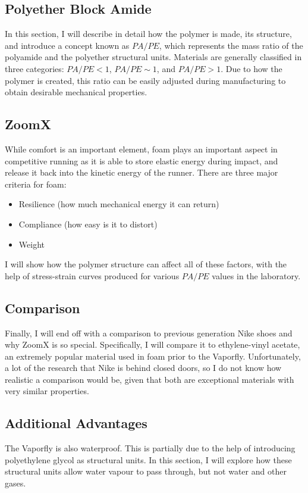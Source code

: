 \documentclass{article}
\begin{document}
    \subsection{Polyether Block Amide}
    In this section, I will describe in detail how the polymer is made, its structure, and introduce a concept known as $PA/PE$, which represents the mass ratio of the polyamide and the polyether structural units. Materials are generally classified in three categories: $PA/PE < 1$, $PA/PE \sim 1$, and $PA/PE > 1$. Due to how the polymer is created, this ratio can be easily adjusted during manufacturing to obtain desirable mechanical properties.\cite{Eustache2006}
    \subsection{ZoomX}
    While comfort is an important element, foam plays an important aspect in competitive running as it is able to store elastic energy during impact, and release it back into the kinetic energy of the runner. There are three major criteria for foam\cite{Hoogkamer2017}:
    \begin{itemize}
        \item Resilience (how much mechanical energy it can return)
        \item Compliance (how easy is it to distort)
        \item Weight
    \end{itemize}
    I will show how the polymer structure can affect all of these factors, with the help of stress-strain curves produced for various $PA/PE$ values in the laboratory.
    \subsection{Comparison}
    Finally, I will end off with a comparison to previous generation Nike shoes and why ZoomX is so special. Specifically, I will compare it to ethylene-vinyl acetate, an extremely popular material used in foam prior to the Vaporfly.\cite{Hoogkamer2017} Unfortunately, a lot of the research that Nike is behind closed doors, so I do not know how realistic a comparison would be, given that both are exceptional materials with very similar properties.

    \subsection{Additional Advantages}
    The Vaporfly is also waterproof. This is partially due to the help of introducing polyethylene glycol as structural units.\cite{Yen1997} In this section, I will explore how these structural units allow water vapour to pass through, but not water and other gases.
\end{document}
